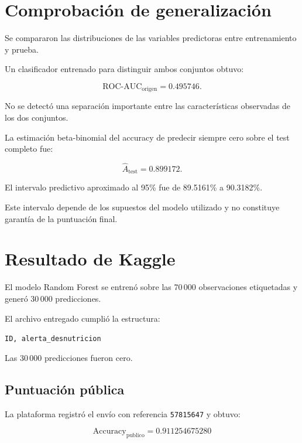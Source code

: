 ﻿\documentclass[11pt,a4paper]{article}
\begin{document}
\section{Comprobación de generalización}

Se compararon las distribuciones de las variables
predictoras entre entrenamiento y prueba.

Un clasificador entrenado para distinguir
ambos conjuntos obtuvo:

\[
\mathrm{ROC\text{-}AUC}_{\mathrm{origen}}
=0.495746.
\]

No se detectó una separación importante
entre las características observadas de los dos
conjuntos.

La estimación beta-binomial del accuracy de
predecir siempre cero sobre el test completo fue:

\[
\widehat A_{\mathrm{test}}=0.899172.
\]

El intervalo predictivo aproximado al 95\%
fue de 89.5161\% a 90.3182\%.

Este intervalo depende de los supuestos del
modelo utilizado y no constituye garantía
de la puntuación final.

\section{Resultado de Kaggle}

El modelo Random Forest se entrenó sobre las
70\,000 observaciones etiquetadas y generó
30\,000 predicciones.

El archivo entregado cumplió la estructura:

\begin{center}
\texttt{ID, alerta\_desnutricion}
\end{center}

Las 30\,000 predicciones fueron cero.

\subsection{Puntuación pública}

La plataforma registró el envío con
referencia \texttt{57815647} y obtuvo:

\[
\boxed{
\mathrm{Accuracy}_{\mathrm{publico}}
=0.911254675280
}
\]
\end{document}

